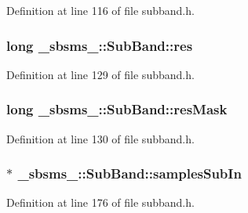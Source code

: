 Definition at line 116 of file subband.\+h.

\subsubsection[{\texorpdfstring{res}{res}}]{\setlength{\rightskip}{0pt plus 5cm}long \+\_\+sbsms\+\_\+\+::\+Sub\+Band\+::res\hspace{0.3cm}{\ttfamily [protected]}}\hypertarget{class__sbsms___1_1_sub_band_afc3876743fce8b87d1f59445126acf02}{}\label{class__sbsms___1_1_sub_band_afc3876743fce8b87d1f59445126acf02}


Definition at line 129 of file subband.\+h.

\subsubsection[{\texorpdfstring{res\+Mask}{resMask}}]{\setlength{\rightskip}{0pt plus 5cm}long \+\_\+sbsms\+\_\+\+::\+Sub\+Band\+::res\+Mask\hspace{0.3cm}{\ttfamily [protected]}}\hypertarget{class__sbsms___1_1_sub_band_a37b04cc87c94135320ecef3d67f56ba5}{}\label{class__sbsms___1_1_sub_band_a37b04cc87c94135320ecef3d67f56ba5}


Definition at line 130 of file subband.\+h.

\subsubsection[{\texorpdfstring{samples\+Sub\+In}{samplesSubIn}}]{$\ast$ \+\_\+sbsms\+\_\+\+::\+Sub\+Band\+::samples\+Sub\+In\hspace{0.3cm}{\ttfamily [protected]}}\hypertarget{class__sbsms___1_1_sub_band_a177eddfed6a09e6ebe72a15f436ead14}{}\label{class__sbsms___1_1_sub_band_a177eddfed6a09e6ebe72a15f436ead14}


Definition at line 176 of file subband.\+h.

